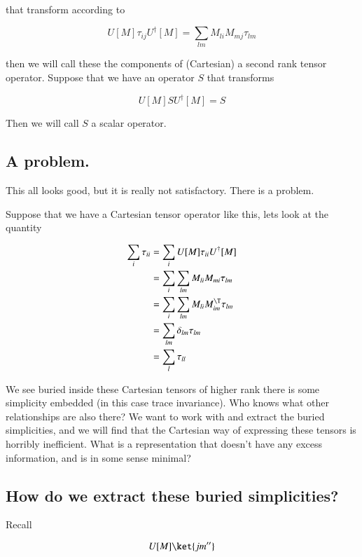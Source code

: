 that transform according to

\begin{equation}\label{eqn:qmTwoL19:190}
U[M] \tau_{ij} U^\dagger[M] = \sum_{lm} M_{li} M_{mj} \tau_{lm}
\end{equation}

then we will call these the components of (Cartesian) a second rank tensor operator.  Suppose that we have an operator $S$ that transforms

\begin{equation}\label{eqn:qmTwoL19:210}
U[M] S U^\dagger[M] = S
\end{equation}

Then we will call $S$ a scalar operator.

\subsection{A problem.}

This all looks good, but it is really not satisfactory.  There is a problem.

Suppose that we have a Cartesian tensor operator like this, lets look at the quantity

\begin{align*}
\sum_i \tau_{ii}
&=
\sum_i
U[M] \tau_{ii} U^\dagger[M]  \\
&= 
\sum_i
\sum_{lm} M_{li} M_{mi} \tau_{lm} 
\\
&= 
\sum_i
\sum_{lm} M_{li} M_{im}^\T \tau_{lm} 
\\
&= 
\sum_{lm} \delta_{lm} \tau_{lm} 
\\
&= 
\sum_{l} \tau_{ll} 
\end{align*}

We see buried inside these Cartesian tensors of higher rank there is some simplicity embedded (in this case trace invariance).  Who knows what other relationships are also there?  We want to work with and extract the buried simplicities, and we will find that the Cartesian way of expressing these tensors is horribly inefficient.  What is a representation that doesn't have any excess information, and is in some sense minimal?

\subsection{How do we extract these buried simplicities?}

Recall 

\begin{equation}\label{eqn:qmTwoL19:230}
U[M] \ket{j m''} 
\end{equation}

